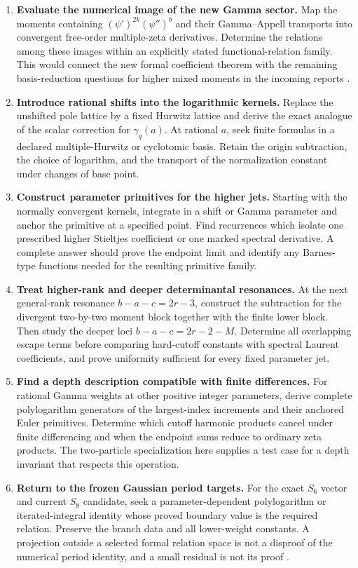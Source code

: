 \documentclass[11pt,letterpaper]{article}
\numberwithin{equation}{section}
\theoremstyle{plain}
\theoremstyle{definition}
\theoremstyle{remark}
\begin{document}
\begin{enumerate}
\item \textbf{Evaluate the numerical image of the new Gamma sector.}
Map the moments containing $(\psi')^{2k}(\psi'')^b$ and their
Gamma--Appell transports into convergent free-order multiple-zeta
derivatives. Determine the relations among these images within an
explicitly stated functional-relation family. This would connect the
new formal coefficient theorem with the remaining basis-reduction questions for
higher mixed moments in the incoming reports \cite{DPL,PTI}.

\item \textbf{Introduce rational shifts into the logarithmic kernels.}
Replace the unshifted pole lattice by a fixed Hurwitz lattice and
derive the exact analogue of the scalar correction for
$\gamma_q(a)$. At rational $a$, seek finite formulas in a declared
multiple-Hurwitz or cyclotomic basis. Retain the origin subtraction,
the choice of logarithm, and the transport of the normalization
constant under changes of base point.

\item \textbf{Construct parameter primitives for the higher jets.}
Starting with the normally convergent kernels, integrate in a shift
or Gamma parameter and anchor the primitive at a specified point.
Find recurrences which isolate one prescribed higher Stieltjes
coefficient or one marked spectral derivative. A complete answer
should prove the endpoint limit and identify any Barnes-type
functions needed for the resulting primitive family.

\item \textbf{Treat higher-rank and deeper determinantal resonances.}
At the next general-rank resonance $b-a-c=2r-3$, construct the
subtraction for the divergent two-by-two moment block together with
the finite lower block. Then study the deeper loci
$b-a-c=2r-2-M$. Determine all overlapping escape terms before
comparing hard-cutoff constants with spectral Laurent coefficients,
and prove uniformity sufficient for every fixed parameter jet.

\item \textbf{Find a depth description compatible with finite differences.}
For rational Gamma weights at other positive integer parameters,
derive complete polylogarithm generators of the largest-index
increments and their anchored Euler primitives. Determine which
cutoff harmonic products cancel under finite differencing and when
the endpoint sums reduce to ordinary zeta products. The two-particle
specialization here supplies a test case for a depth invariant that
respects this operation.

\item \textbf{Return to the frozen Gaussian period targets.}
For the exact $S_6$ vector and current $S_8$ candidate, seek a
parameter-dependent polylogarithm or iterated-integral identity whose
proved boundary value is the required relation. Preserve the branch
data and all lower-weight constants. A projection outside a selected
formal relation space is not a disproof of the numerical period
identity, and a small residual is not its proof \cite{Repo}.
\end{enumerate}
\end{document}
